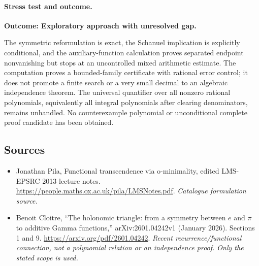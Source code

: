 \documentclass[11pt,a4paper]{article}
\numberwithin{equation}{section}
\begin{document}
\paragraph{Stress test and outcome.}
\textbf{Outcome: Exploratory approach with unresolved gap.}

The symmetric reformulation is exact, the Schanuel implication is
explicitly conditional, and the auxiliary-function calculation proves separated endpoint
nonvanishing but stops at an uncontrolled mixed arithmetic estimate. The computation proves
a bounded-family certificate with rational error control; it does not
promote a finite search or a very small decimal to an algebraic
independence theorem. The universal quantifier over all nonzero rational
polynomials, equivalently all integral polynomials after clearing
denominators, remains unhandled. No counterexample polynomial or
unconditional complete proof candidate has been obtained.
\subsection{Sources}
\begin{itemize}\raggedright
\item[\textnormal{[S1]}]\hypertarget{source:168:1}{} Jonathan Pila, Functional transcendence via o-minimality, edited LMS-EPSRC 2013 lecture notes.
\url{https://people.maths.ox.ac.uk/pila/LMSNotes.pdf}.
{\small\textit{Catalogue formulation source.}}
\item[\textnormal{[E1]}]\hypertarget{extra:168:1}{} Benoit Cloitre, ``The holonomic triangle: from a symmetry between $e$ and $\pi$ to additive Gamma functions,'' arXiv:2601.04242v1 (January 2026). Sections 1 and 9.
\url{https://arxiv.org/pdf/2601.04242}.
{\small\textit{Recent recurrence/functional connection, not a polynomial relation or an independence proof. Only the stated scope is used.}}
\end{itemize}
\end{document}
